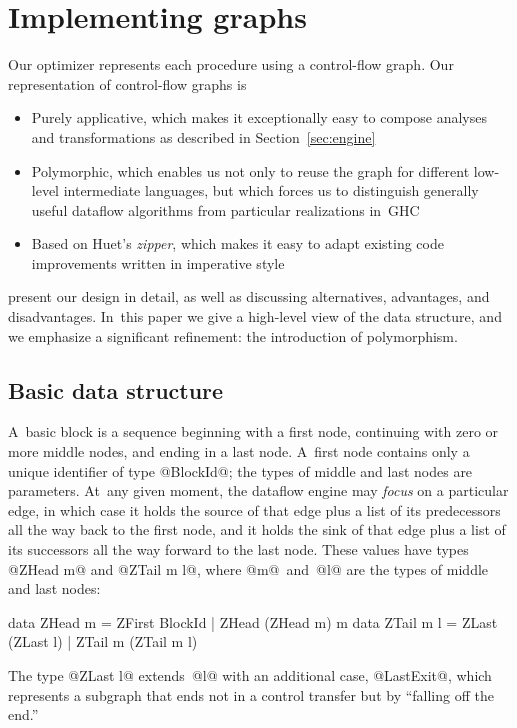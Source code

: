 \documentclass[blockstyle,preprint,nocopyrightspace]{sigplanconf}
\newcommand\secref[1]{Section~\ref{sec:#1}}
\newcommand\seclabel[1]{\label{sec:#1}}
\begin{document}
\ifseparateengine\else

\section{Implementing graphs}
\seclabel{graphs}

Our optimizer represents each procedure using a control-flow graph.
Our representation of control-flow graphs is
\begin{itemize}
\item
Purely applicative, which makes it exceptionally easy to compose
analyses and transformations as described in \secref{engine}
\item
Polymorphic, which enables us not only to reuse the graph for
different low-level intermediate languages, but which forces us to
distinguish generally useful dataflow algorithms from particular
realizations in~GHC
\item
Based on Huet's \citeyearpar{huet:zipper} \emph{zipper},
which makes it easy to adapt existing code improvements written in
imperative style
\end{itemize}
\citet{dias-ramsey:applicative-flow-graph} present our design in
detail, as well as discussing alternatives, advantages, and
disadvantages.
In~this paper we give a high-level view of the data structure, and we
emphasize a significant refinement: the introduction of polymorphism.

\subsection{Basic data structure}

A~basic block is a sequence beginning with a first node, continuing
with zero or more middle nodes, and ending in a last node.
A~first node contains only a unique identifier of type @BlockId@; the
types of middle and last nodes are parameters.
At~any given moment, the dataflow engine may \emph{focus} on a
particular edge, in which case 
it holds the source of that edge plus a
list of its predecessors all the way back to the first node,
and 
it holds the sink of that edge plus a
list of its successors all the way forward to the last node.
These values have types @ZHead m@ and @ZTail m l@, where @m@~and~@l@
are the types of middle and last nodes:
\begin{code}
data ZHead m   = ZFirst BlockId 
               | ZHead (ZHead m) m
data ZTail m l = ZLast (ZLast l) | ZTail m (ZTail m l)
\end{code}
The type @ZLast l@ extends~@l@ with an additional case, @LastExit@,
which represents a subgraph that ends not in a control transfer but by
``falling off the end.''
\end{document}
